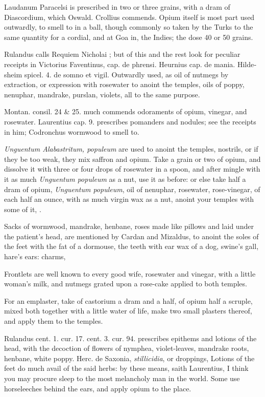 Laudanum Paracelsi is prescribed in two or three grains, with a dram of
Diascordium, which Oswald. Crollius commends. Opium itself is most part
used outwardly, to smell to in a ball, though commonly so taken by the
Turks to the same quantity for a cordial, and at Goa in, the
Indies; the dose 40 or 50 grains.

Rulandus calls Requiem Nicholai ; but
of this and the rest look for peculiar receipts in \textlatin{Victorius
Faventinus, cap. de phrensi. Heurnius cap. de mania. Hildesheim spicel.
4. de somno et vigil.} \etc{} Outwardly used, as oil of nutmegs by
extraction, or expression with rosewater to anoint the temples, oils of
poppy, nenuphar, mandrake, purslan, violets, all to the same purpose.

Montan. consil. 24 \& 25. much commends odoraments of opium, vinegar,
and rosewater. Laurentius cap. 9. prescribes pomanders and nodules; see
the receipts in him; Codronchus wormwood to smell to.

\emph{Unguentum Alabastritum, populeum} are used to anoint the temples,
nostrils, or if they be too weak, they mix saffron and opium. Take a
grain or two of opium, and dissolve it with three or four drops of
rosewater in a spoon, and after mingle with it as much \emph{Unguentum
populeum} as a nut, use it as before: or else take half a dram of
opium, \emph{Unguentum populeum}, oil of nenuphar, rosewater, rose-vinegar,
of each half an ounce, with as much virgin wax as a nut, anoint your
temples with some of it, .

Sacks of wormwood, mandrake, henbane,
roses made like pillows and laid under the patient's head, are mentioned by
Cardan and Mizaldus, to anoint the soles of the feet with
the fat of a dormouse, the teeth with ear wax of a dog, swine's gall, hare's
ears: charms, \etc{}

Frontlets are well known to every good wife, rosewater and vinegar,
with a little woman's milk, and nutmegs grated upon a rose-cake applied
to both temples.

For an emplaster, take of castorium a dram and a half, of opium half a
scruple, mixed both together with a little water of life, make two
small plasters thereof, and apply them to the temples.

Rulandus cent. 1. cur. 17. cent. 3. cur. 94. prescribes epithems and
lotions of the head, with the decoction of flowers of nymphea,
violet-leaves, mandrake roots, henbane, white poppy. Herc. de Saxonia,
\emph{stillicidia}, or droppings, \etc{} Lotions of the feet do much avail of
the said herbs: by these means, saith Laurentius, I think you may
procure sleep to the most melancholy man in the world. Some use
horseleeches behind the ears, and apply opium to the place.

